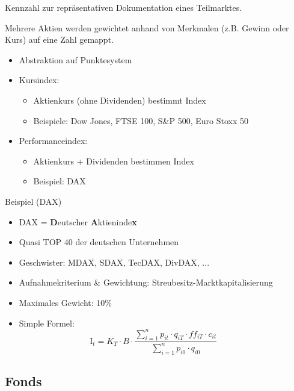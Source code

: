 \documentclass{beamer}
\begin{document}
			\begin{frame}
				\begin{definition}
					Kennzahl zur repräsentativen Dokumentation eines Teilmarktes.
				\end{definition}
				Mehrere Aktien werden gewichtet anhand von Merkmalen (z.B. Gewinn oder Kurs) auf eine Zahl gemappt.
			
				\begin{itemize}
					\item Abstraktion auf Punktesystem\pause
					\item Kursindex:
					\begin{itemize}
						\item Aktienkurs (ohne Dividenden) bestimmt Index
						\item Beispiele: Dow Jones, FTSE 100, S\&P 500, Euro Stoxx 50
					\end{itemize}\pause
					\item Performanceindex:
					\begin{itemize}
						\item Aktienkurs + Dividenden bestimmen Index
						\item Beispiel: DAX
					\end{itemize}
				\end{itemize}
			\end{frame}
		
			\begin{frame}{Beispiel (DAX)}
				\begin{itemize}
					\item DAX = \textbf{D}eutscher \textbf{A}ktieninde\textbf{x}\citewiki{DAX}
					\item Quasi TOP 40 der deutschen Unternehmen
					\item Geschwister: MDAX, SDAX, TecDAX, DivDAX, ...
					\item Aufnahmekriterium \& Gewichtung: Streubesitz-Marktkapitalisierung
					\item Maximales Gewicht: 10\%
					\item Simple Formel:\pause
					\[
						\text{I}_t = K_T \cdot B \cdot \frac
						{
							\sum_{i=1}^{n} p_{it} \cdot q_{iT} \cdot ff_{iT} \cdot c_{it}
						}
						{
							\sum_{i=1}^{n} p_{i0} \cdot q_{i0}
						}\hspace{1cm}
					\]
				\end{itemize}
			\end{frame}
		
		\subsection{Fonds}
		
\end{document}
